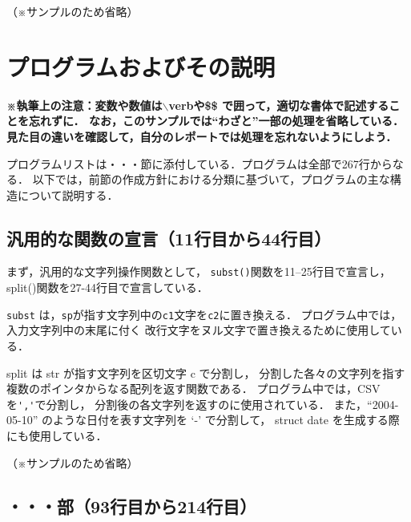\documentclass[a4j,11pt]{jarticle}
\begin{document}
（※サンプルのため省略）

\section{プログラムおよびその説明}

\textbf{\small ※執筆上の注意：変数や数値は$\backslash$verbや\$\$
    で囲って，適切な書体で記述することを忘れずに．
    なお，このサンプルでは``わざと''一部の処理を省略している．
    見た目の違いを確認して，自分のレポートでは処理を忘れないようにしよう．\\}


プログラムリストは・・・節に添付している．プログラムは全部で267行からなる．
以下では，前節の作成方針における分類に基づいて，プログラムの主な構造について説明する．

\subsection{汎用的な関数の宣言（11行目から44行目）}

まず，汎用的な文字列操作関数として，
\verb|subst()|関数を11--25行目で宣言し， %
split()関数を27-44行目で宣言している．       %

\verb|subst| は，\verb|sp|が指す文字列中の\verb|c1|文字を\verb|c2|に置き換える．
プログラム中では，入力文字列中の末尾に付く
改行文字をヌル文字で置き換えるために使用している．

split は str が指す文字列を区切文字 c で分割し，
分割した各々の文字列を指す複数のポインタからなる配列を返す関数である．
プログラム中では，CSVを\verb|','|で分割し，
分割後の各文字列を返すのに使用されている．
また，``2004-05-10'' のような日付を表す文字列を `-' で分割して，
struct date を生成する際にも使用している．

（※サンプルのため省略）

\subsection{・・・部（93行目から214行目）}
\end{document}
